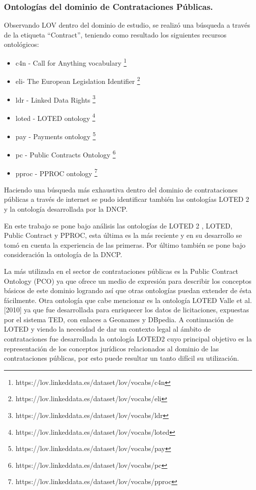\subsubsection{Ontologías del dominio de Contrataciones Públicas.}

Observando LOV dentro del dominio de estudio, se realizó una búsqueda a través de la etiqueta “Contract”, teniendo como resultado los siguientes recursos ontológicos:

\begin{itemize}
    \item c4n - Call for Anything vocabulary \footnote{https://lov.linkeddata.es/dataset/lov/vocabs/c4n}
    \item eli- The European Legislation Identifier \footnote{https://lov.linkeddata.es/dataset/lov/vocabs/eli}
    \item ldr - Linked Data Rights \footnote{https://lov.linkeddata.es/dataset/lov/vocabs/ldr}
    \item loted - LOTED ontology \footnote{https://lov.linkeddata.es/dataset/lov/vocabs/loted}
    \item pay - Payments ontology \footnote{https://lov.linkeddata.es/dataset/lov/vocabs/pay}
    \item  pc - Public Contracts Ontology \footnote{https://lov.linkeddata.es/dataset/lov/vocabs/pc}
    \item pproc - PPROC ontology \footnote{https://lov.linkeddata.es/dataset/lov/vocabs/pproc} 
\end{itemize}


Haciendo una búsqueda más exhaustiva dentro del dominio de contrataciones públicas a través de internet se pudo identificar también las ontologías LOTED 2 y la ontología desarrollada por la DNCP.

En este trabajo se pone bajo análisis las ontologías de LOTED 2 , LOTED, Public Contract y PPROC, esta última es la más reciente y en su desarrollo se tomó en cuenta la experiencia de las primeras. Por último también se pone bajo consideración la ontología de la DNCP.

La más utilizada en el sector de contrataciones públicas es la Public Contract Ontology (PCO)\cite{klimek2012lod2}  ya que ofrece un medio de expresión para describir los conceptos básicos de este dominio logrando así que otras ontologías puedan extender de ésta fácilmente. Otra ontología que cabe mencionar es la ontología LOTED Valle et al. [2010] ya que fue desarrollada para enriquecer los datos de licitaciones, expuestas por el sistema TED, con enlaces a Geonames y DBpedia. A continuación de LOTED y viendo la necesidad de dar un contexto legal al ámbito de contrataciones fue desarrollada la ontología LOTED2\cite{distinto2014loted2} cuyo principal objetivo es la representación de los conceptos jurídicos relacionados al dominio de las contrataciones públicas, por esto puede resultar un tanto difícil su utilización.


